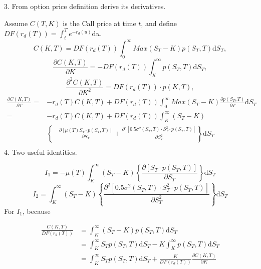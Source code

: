 \documentclass[12pt]{article}
\begin{document}
3. From option price definition derive its derivatives. \par
Assume $C(T,K)$ is the Call price at time $t$, and define $DF(r_d(T))=\int_t^T e^{-r_d(u)}\mathrm{d}u$.
\begin{equation}
    C(K,T)=DF(r_d(T)) \int_0^\infty Max(S_T-K)p(S_T,T)\mathrm{d}S_T,
\end{equation}
\begin{equation}
    \frac{\partial C(K,T)}{\partial K}=-DF(r_d(T)) \int_K^\infty p(S_T,T)\mathrm{d}S_T,
\end{equation}
\begin{equation}
    \frac{\partial^2 C(K,T)}{\partial K^2}=DF(r_d(T)) \cdot p(K,T),
\end{equation}
\begin{equation}
\begin{split}
    \frac{\partial C(K,T)}{\partial T}=&-r_d(T)C(K,T)+DF(r_d(T)) \int_0^\infty Max(S_T-K) \frac{\partial p(S_T,T)}{\partial T}\mathrm{d}S_T \\
    =&-r_d(T)C(K,T)+DF(r_d(T)) \int_K^\infty (S_T-K) \\
    &\left\{-\frac{\partial[\mu(T) S_T\cdot p(S_T,T)]}{\partial S_T}+\frac{\partial^2 [0.5\sigma^2(S_T,T)\cdot S^2_T\cdot p(S_T,T)]}{\partial S^2_T}\right\}\mathrm{d}S_T \\
\end{split}
\end{equation}
4. Two useful identities. \par
\begin{equation}
    I_1 = -\mu(T) \int_K^\infty (S_T-K)\left\{\frac{\partial[S_T\cdot p(S_T,T)]}{\partial S_T}\right\}\mathrm{d}S_T
\end{equation}
\begin{equation}
    I_2 = \int_K^\infty (S_T-K)\left\{\frac{\partial^2 [0.5\sigma^2(S_T,T)\cdot S^2_T\cdot p(S_T,T)]}{\partial S^2_T}\right\}\mathrm{d}S_T
\end{equation}
For $I_1$, because \par
\begin{equation}
\begin{split}
    \frac{C(K,T)}{DF(r_d(T))} &= \int_K^\infty (S_T-K)p(S_T,T)\mathrm{d}S_T \\
    &= \int_K^\infty S_Tp(S_T,T)\mathrm{d}S_T - K\int_K^\infty p(S_T,T)\mathrm{d}S_T \\
    &= \int_K^\infty S_Tp(S_T,T)\mathrm{d}S_T + \frac{K}{DF(r_d(T))}\frac{\partial C(K,T)}{\partial K}
\end{split}
\end{equation}
\end{document}
